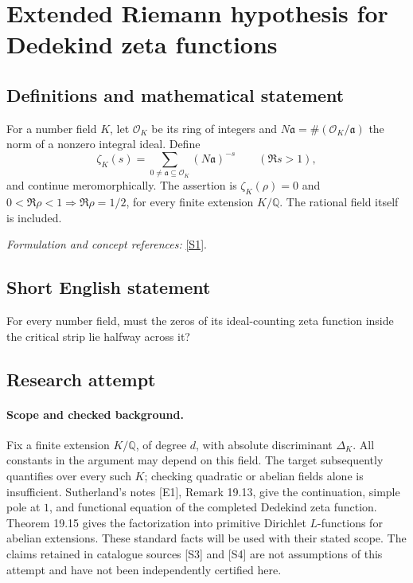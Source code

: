 \documentclass[11pt]{article}
\begin{document}
\section*{\texorpdfstring{Extended Riemann hypothesis for Dedekind zeta functions}{Extended Riemann hypothesis for Dedekind zeta functions}}\label{10}
\subsection{Definitions and mathematical statement}
For a number field $K$, let $\mathcal O_K$ be its ring of integers and $N\mathfrak a=\#(\mathcal O_K/\mathfrak a)$ the norm of a nonzero integral ideal. Define
\[
 \zeta_K(s)=\sum_{0\ne\mathfrak a\subseteq\mathcal O_K}(N\mathfrak a)^{-s}
 \qquad(\Re s>1),
\]
and continue meromorphically. The assertion is $\zeta_K(\rho)=0$ and $0<\Re\rho<1\Rightarrow\Re\rho=1/2$, for every finite extension $K/{\mathbb{Q}}$. The rational field itself is included.
\par\smallskip\textit{Formulation and concept references:} \href{https://www.aimath.org/WWN/rh/articles/html/18a/}{[S1]}.

\subsection{Short English statement}
For every number field, must the zeros of its ideal-counting zeta function inside the critical strip lie halfway across it?
\subsection{Research attempt}

\paragraph{Scope and checked background.}
Fix a finite extension $K/\mathbb Q$, of degree $d$, with absolute
discriminant $\Delta_K$. All constants in the argument may depend on this
field. The target subsequently quantifies over every such $K$; checking
quadratic or abelian fields alone is insufficient. Sutherland's notes
[E1], Remark 19.13, give the continuation, simple pole at $1$, and
functional equation of the completed Dedekind zeta function. Theorem 19.15
gives the factorization into primitive Dirichlet $L$-functions for abelian
extensions. These standard facts will be used with their stated scope.
The claims retained in catalogue sources [S3] and [S4] are not assumptions
of this attempt and have not been independently certified here.
\end{document}
